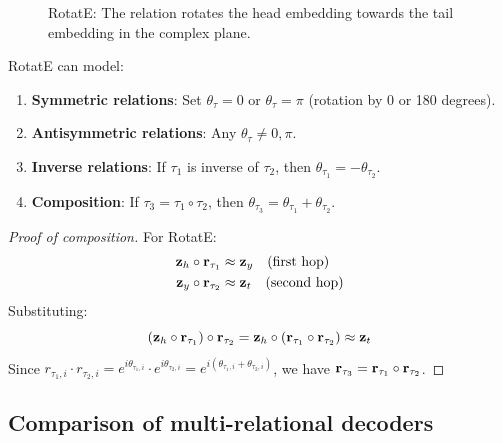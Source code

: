 \begin{notechapter}
\begin{figure}[htbp]
\caption{RotatE: The relation rotates the head embedding towards the tail embedding in the complex plane.}
\label{shallow-embeddings:fig:rotate}
\end{figure}

\begin{proposition}
RotatE can model:
\begin{enumerate}
    \item \textbf{Symmetric relations}: Set $\theta_\tau = 0$ or $\theta_\tau = \pi$ (rotation by 0 or 180 degrees).
    \item \textbf{Antisymmetric relations}: Any $\theta_\tau \neq 0, \pi$.
    \item \textbf{Inverse relations}: If $\tau_1$ is inverse of $\tau_2$, then $\theta_{\tau_1} = -\theta_{\tau_2}$.
    \item \textbf{Composition}: If $\tau_3 = \tau_1 \circ \tau_2$, then $\theta_{\tau_3} = \theta_{\tau_1} + \theta_{\tau_2}$.
\end{enumerate}
\end{proposition}

\begin{proof}[Proof of composition]
For RotatE:
\begin{align*}
\mathbf{z}_h \circ \mathbf{r}_{\tau_1} &\approx \mathbf{z}_y \quad \text{(first hop)} \\
\mathbf{z}_y \circ \mathbf{r}_{\tau_2} &\approx \mathbf{z}_t \quad \text{(second hop)}
\end{align*}
Substituting:
\[
(\mathbf{z}_h \circ \mathbf{r}_{\tau_1}) \circ \mathbf{r}_{\tau_2} = \mathbf{z}_h \circ (\mathbf{r}_{\tau_1} \circ \mathbf{r}_{\tau_2}) \approx \mathbf{z}_t
\]
Since $r_{\tau_1,i} \cdot r_{\tau_2,i} = e^{i\theta_{\tau_1,i}} \cdot e^{i\theta_{\tau_2,i}} = e^{i(\theta_{\tau_1,i} + \theta_{\tau_2,i})}$, we have $\mathbf{r}_{\tau_3} = \mathbf{r}_{\tau_1} \circ \mathbf{r}_{\tau_2}$.
\end{proof}

\subsection{Comparison of multi-relational decoders}


\end{notechapter}
